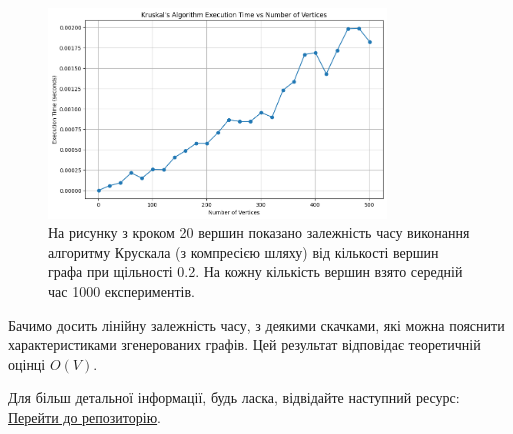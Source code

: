 \documentclass{article}
\begin{document}
\begin{figure}[h!]
    \centering
    \includegraphics[width=0.8\textwidth]{img/image02.png}
    \caption{На рисунку з кроком 20 вершин показано залежність часу виконання алгоритму Крускала (з компресією шляху) 
    від кількості вершин графа при щільності 0.2. На кожну кількість вершин взято середній час 1000 експериментів.}
\end{figure}

Бачимо досить лінійну залежність часу, з деякими скачками, які можна пояснити характеристиками згенерованих графів. 
Цей результат відповідає теоретичній оцінці $O(V)$.

Для більш детальної інформації, будь ласка, відвідайте наступний ресурс: \href{https://github.com/gre1wy/AppliedAlgorithms/tree/main/lab4}{Перейти до репозиторію}.
\end{document}
